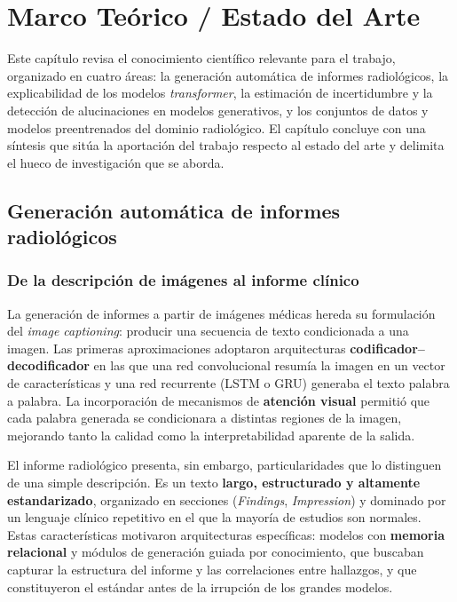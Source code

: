\chapter{Marco Teórico / Estado del Arte}

Este capítulo revisa el conocimiento científico relevante para el trabajo, organizado en cuatro
áreas: la generación automática de informes radiológicos, la explicabilidad de los modelos
\textit{transformer}, la estimación de incertidumbre y la detección de alucinaciones en modelos
generativos, y los conjuntos de datos y modelos preentrenados del dominio radiológico. El capítulo
concluye con una síntesis que sitúa la aportación del trabajo respecto al estado del arte y delimita
el hueco de investigación que se aborda.

\section{Generación automática de informes radiológicos}

\subsection{De la descripción de imágenes al informe clínico}
La generación de informes a partir de imágenes médicas hereda su formulación del \textit{image
captioning}: producir una secuencia de texto condicionada a una imagen. Las primeras aproximaciones
adoptaron arquitecturas \textbf{codificador--decodificador} en las que una red convolucional
resumía la imagen en un vector de características y una red recurrente (LSTM o GRU) generaba el texto
palabra a palabra. La incorporación de mecanismos de \textbf{atención visual} permitió que cada
palabra generada se condicionara a distintas regiones de la imagen, mejorando tanto la calidad como
la interpretabilidad aparente de la salida.

El informe radiológico presenta, sin embargo, particularidades que lo distinguen de una simple
descripción. Es un texto \textbf{largo, estructurado y altamente estandarizado}, organizado en
secciones (\textit{Findings}, \textit{Impression}) y dominado por un lenguaje clínico repetitivo en
el que la mayoría de estudios son normales. Estas características motivaron arquitecturas específicas:
modelos con \textbf{memoria relacional} y módulos de generación guiada por conocimiento, que buscaban
capturar la estructura del informe y las correlaciones entre hallazgos, y que constituyeron el
estándar antes de la irrupción de los grandes modelos.

